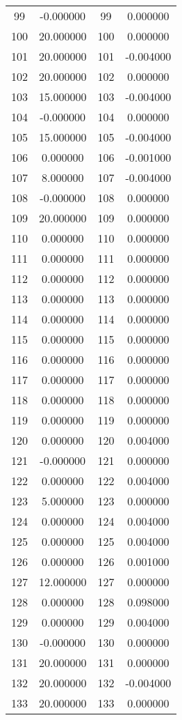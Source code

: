 \documentclass[12pt]{article}
\begin{document}
\begin{longtable}{@{}cccc@{}}
99 & -0.000000 & 99 & 0.000000 \\
100 & 20.000000 & 100 & 0.000000 \\
101 & 20.000000 & 101 & -0.004000 \\
102 & 20.000000 & 102 & 0.000000 \\
103 & 15.000000 & 103 & -0.004000 \\
104 & -0.000000 & 104 & 0.000000 \\
105 & 15.000000 & 105 & -0.004000 \\
106 & 0.000000 & 106 & -0.001000 \\
107 & 8.000000 & 107 & -0.004000 \\
108 & -0.000000 & 108 & 0.000000 \\
109 & 20.000000 & 109 & 0.000000 \\
110 & 0.000000 & 110 & 0.000000 \\
111 & 0.000000 & 111 & 0.000000 \\
112 & 0.000000 & 112 & 0.000000 \\
113 & 0.000000 & 113 & 0.000000 \\
114 & 0.000000 & 114 & 0.000000 \\
115 & 0.000000 & 115 & 0.000000 \\
116 & 0.000000 & 116 & 0.000000 \\
117 & 0.000000 & 117 & 0.000000 \\
118 & 0.000000 & 118 & 0.000000 \\
119 & 0.000000 & 119 & 0.000000 \\
120 & 0.000000 & 120 & 0.004000 \\
121 & -0.000000 & 121 & 0.000000 \\
122 & 0.000000 & 122 & 0.004000 \\
123 & 5.000000 & 123 & 0.000000 \\
124 & 0.000000 & 124 & 0.004000 \\
125 & 0.000000 & 125 & 0.004000 \\
126 & 0.000000 & 126 & 0.001000 \\
127 & 12.000000 & 127 & 0.000000 \\
128 & 0.000000 & 128 & 0.098000 \\
129 & 0.000000 & 129 & 0.004000 \\
130 & -0.000000 & 130 & 0.000000 \\
131 & 20.000000 & 131 & 0.000000 \\
132 & 20.000000 & 132 & -0.004000 \\
133 & 20.000000 & 133 & 0.000000 \\

\end{longtable}
\end{document}
